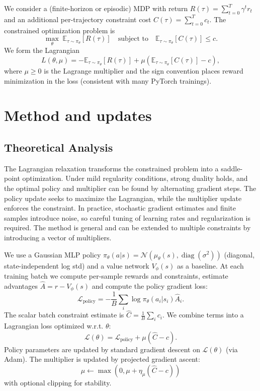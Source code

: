 We consider a (finite-horizon or episodic) MDP with return $R(\tau)=\sum_{t=0}^{T} \gamma^t r_t$ and an additional per-trajectory constraint cost $C(\tau)=\sum_{t=0}^T c_t$. The constrained optimization problem is
\begin{equation}
  \max_{\theta} \; \mathbb{E}_{\tau\sim\pi_\theta}[R(\tau)] \quad \text{subject to} \quad \mathbb{E}_{\tau\sim\pi_\theta}[C(\tau)] \le c.
\end{equation}
We form the Lagrangian
\begin{equation}
  L(\theta,\mu) = -\mathbb{E}_{\tau\sim\pi_\theta}[R(\tau)] + \mu\left(\mathbb{E}_{\tau\sim\pi_\theta}[C(\tau)] - c\right),
\end{equation}
where $\mu \ge 0$ is the Lagrange multiplier and the sign convention places reward minimization in the loss (consistent with many PyTorch trainings).

\section{Method and updates}
\subsection{Theoretical Analysis}
The Lagrangian relaxation transforms the constrained problem into a saddle-point optimization. Under mild regularity conditions, strong duality holds, and the optimal policy and multiplier can be found by alternating gradient steps. The policy update seeks to maximize the Lagrangian, while the multiplier update enforces the constraint. In practice, stochastic gradient estimates and finite samples introduce noise, so careful tuning of learning rates and regularization is required. The method is general and can be extended to multiple constraints by introducing a vector of multipliers.

We use a Gaussian MLP policy $\pi_\theta(a|s)=\mathcal{N}(\mu_\theta(s),\operatorname{diag}(\sigma^2))$ (diagonal, state-independent log std) and a value network $V_\phi(s)$ as a baseline. At each training batch we compute per-sample rewards and constraints, estimate advantages $\hat{A}=r - V_\phi(s)$ and compute the policy gradient loss:
\begin{equation}
  \mathcal{L}_\text{policy} = -\frac{1}{B}\sum_i \log\pi_\theta(a_i|s_i) \hat{A}_i.
\end{equation}
The scalar batch constraint estimate is $\hat{C}=\frac{1}{B}\sum_i c_i$. We combine terms into a Lagrangian loss optimized w.r.t. $\theta$:
\begin{equation}
  \mathcal{L}(\theta) = \mathcal{L}_\text{policy} + \mu \left(\hat{C} - c\right).
\end{equation}
Policy parameters are updated by standard gradient descent on $\mathcal{L}(\theta)$ (via Adam). The multiplier is updated by projected gradient ascent:
\begin{equation}
  \mu \leftarrow \max\left(0, \mu + \eta_\mu (\hat{C} - c)\right)
\end{equation}
with optional clipping for stability.

